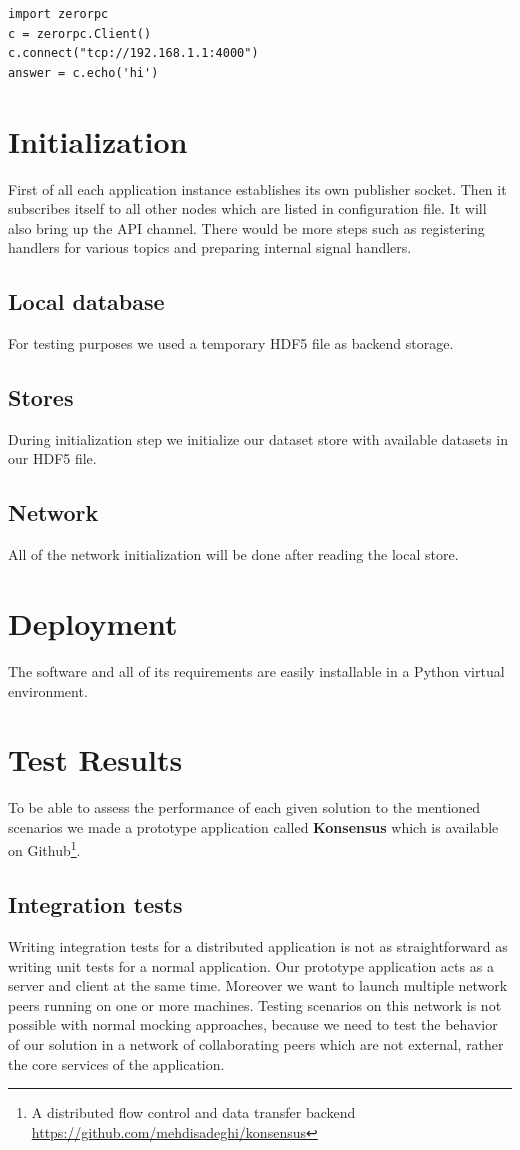 \begin{lstlisting}[caption={Connecting to an API endpoint in ZeroRPC}]
import zerorpc
c = zerorpc.Client()
c.connect("tcp://192.168.1.1:4000")
answer = c.echo('hi')
\end{lstlisting}

\section{Initialization}
First of all each application instance establishes its own publisher socket. Then it subscribes
itself to all other nodes which are listed in configuration file. It will also bring up the API channel.
There would be more steps such as registering handlers for various topics and preparing internal
signal handlers.
\subsection{Local database}
For testing purposes we used a temporary HDF5 file as backend storage.
\subsection{Stores}
During initialization step we initialize our dataset store with available datasets in our HDF5 file.
\subsection{Network}
All of the network initialization will be done after reading the local store.

\section{Deployment}
The software and all of its requirements are easily installable in a Python virtual environment.

\section{Test Results}
To be able to assess the performance of each given solution to the mentioned scenarios we made a prototype application
called \textbf{Konsensus} which is available on Github\footnote{A distributed flow control and data 
transfer backend \url{https://github.com/mehdisadeghi/konsensus}}.

\subsection{Integration tests}
Writing integration tests for a distributed application is not as straightforward as writing unit tests for a normal application. 
Our prototype application acts as a server and client at the same time. Moreover we want to launch multiple 
network peers running on one or more machines. Testing scenarios on this network is not possible with
normal mocking approaches, because we need to test the behavior of our solution in a network of collaborating
peers which are not external, rather the core services of the application. 

